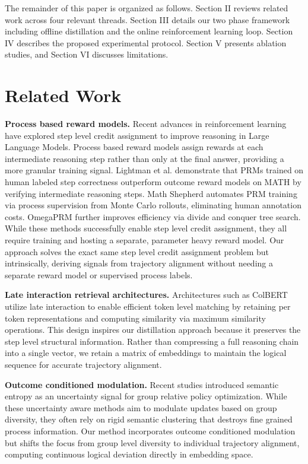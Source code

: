 \documentclass[conference]{IEEEtran}
\begin{document}
The remainder of this paper is organized as follows. Section II reviews related work across four relevant threads. Section III details our two phase framework including offline distillation and the online reinforcement learning loop. Section IV describes the proposed experimental protocol. Section V presents ablation studies, and Section VI discusses limitations.

\section{Related Work}

\textbf{Process based reward models.} Recent advances in reinforcement learning have explored step level credit assignment to improve reasoning in Large Language Models. Process based reward models assign rewards at each intermediate reasoning step rather than only at the final answer, providing a more granular training signal. Lightman et al. demonstrate that PRMs trained on human labeled step correctness outperform outcome reward models on MATH by verifying intermediate reasoning steps. Math Shepherd automates PRM training via process supervision from Monte Carlo rollouts, eliminating human annotation costs. OmegaPRM further improves efficiency via divide and conquer tree search. While these methods successfully enable step level credit assignment, they all require training and hosting a separate, parameter heavy reward model. Our approach solves the exact same step level credit assignment problem but intrinsically, deriving signals from trajectory alignment without needing a separate reward model or supervised process labels.

\textbf{Late interaction retrieval architectures.} Architectures such as ColBERT utilize late interaction to enable efficient token level matching by retaining per token representations and computing similarity via maximum similarity operations. This design inspires our distillation approach because it preserves the step level structural information. Rather than compressing a full reasoning chain into a single vector, we retain a matrix of embeddings to maintain the logical sequence for accurate trajectory alignment.

\textbf{Outcome conditioned modulation.} Recent studies introduced semantic entropy as an uncertainty signal for group relative policy optimization. While these uncertainty aware methods aim to modulate updates based on group diversity, they often rely on rigid semantic clustering that destroys fine grained process information. Our method incorporates outcome conditioned modulation but shifts the focus from group level diversity to individual trajectory alignment, computing continuous logical deviation directly in embedding space.
\end{document}
